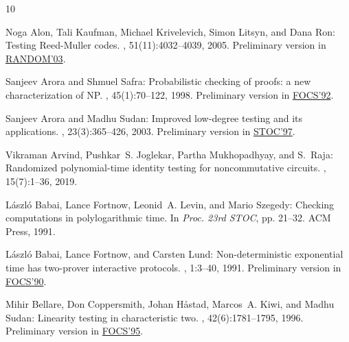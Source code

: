 \documentclass[11pt]{article}
\numberwithin{equation}{section}
\theoremstyle{definition}
\theoremstyle{plain}
\theoremstyle{plain}
\begin{document}
\tocrefpdfbookmark
\begin{thebibliography}{10}

{\sc Noga Alon, Tali Kaufman, Michael Krivelevich, Simon Litsyn, and Dana Ron}:
  Testing {R}eed-{M}uller codes.
, 51(11):4032--4039, 2005.
\newblock Preliminary version in
  \href{https://doi.org/10.1007/978-3-540-45198-3\_17}{RANDOM'03}.

{\sc Sanjeev Arora and Shmuel Safra}: Probabilistic checking of proofs: a new
  characterization of {NP}.
, 45(1):70--122, 1998.
\newblock Preliminary version in
  \href{https://doi.org/10.1109/SFCS.1992.267824}{FOCS'92}.
\newblock [\epfmtdoi{10.1145/273865.273901}]

{\sc Sanjeev Arora and Madhu Sudan}: Improved low-degree testing and its
  applications.
, 23(3):365--426, 2003.
\newblock Preliminary version in
  \href{https://doi.org/10.1145/258533.258642}{STOC'97}.
\newblock [\epfmtdoi{10.1007/s00493-003-0025-0}]

{\sc Vikraman Arvind, Pushkar~S. Joglekar, Partha Mukhopadhyay, and S.~Raja}:
  Randomized polynomial-time identity testing for noncommutative circuits.
, 15(7):1--36, 2019.

{\sc L\'{a}szl\'{o} Babai, Lance Fortnow, Leonid~A. Levin, and Mario Szegedy}:
  Checking computations in polylogarithmic time.
\newblock In {\em Proc. 23rd STOC}, pp. 21--32. ACM Press, 1991.
\newblock [\epfmtdoi{10.1145/103418.103428}]

{\sc L{\'{a}}szl{\'{o}} Babai, Lance Fortnow, and Carsten Lund}:
  Non-deterministic exponential time has two-prover interactive protocols.
, 1:3--40, 1991.
\newblock Preliminary version in
  \href{https://doi.org/10.1109/FSCS.1990.89520}{FOCS'90}.
\newblock [\epfmtdoi{10.1007/BF01200056}]

{\sc Mihir Bellare, Don Coppersmith, Johan H{\aa}stad, Marcos~A. Kiwi, and
  Madhu Sudan}: Linearity testing in characteristic two.
, 42(6):1781--1795, 1996.
\newblock Preliminary version in
  \href{http://doi.org/10.1109/SFCS.1995.492574}{FOCS'95}.
\newblock [\epfmtdoi{10.1109/18.556674}]


\end{thebibliography}
\end{document}
